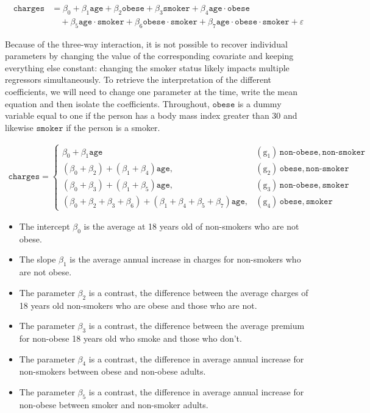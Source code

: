 \documentclass[
  11pt,
  letterpaper,
]{book}
\providecommand{\tightlist}{%
  \setlength{\itemsep}{0pt}\setlength{\parskip}{0pt}}
\theoremstyle{definition}
\theoremstyle{definition}
\theoremstyle{definition}
\theoremstyle{definition}
\theoremstyle{remark}
\begin{document}
\begin{align*}
\texttt{charges} &= \beta_{0} + \beta_{1}\texttt{age} + \beta_{2}\texttt{obese} + \beta_{3}\texttt{smoker} +
\beta_{4}\texttt{age} \cdot \texttt{obese} \\&\quad + \beta_{5}\texttt{age} \cdot \texttt{smoker} + \beta_{6}\texttt{obese} \cdot \texttt{smoker} + \beta_{7}\texttt{age} \cdot \texttt{obese} \cdot \texttt{smoker} + \varepsilon
\end{align*}

Because of the three-way interaction, it is not possible to recover individual parameters by changing the value of the corresponding covariate and keeping everything else constant: changing the smoker status likely impacts multiple regressors simultaneously. To retrieve the interpretation of the different coefficients, we will need to change one parameter at the time, write the mean equation and then isolate the coefficients. Throughout, \(\texttt{obese}\) is a dummy variable equal to one if the person has a body mass index greater than 30 and likewise \(\texttt{smoker}\) if the person is a smoker.

\begin{align*}
\texttt{charges}  =
\begin{cases}
\beta_{0} + \beta_{1}\texttt{age}  & (\mathrm{g}_1)\, \texttt{non-obese}, \texttt{non-smoker} \\
(\beta_{0} + \beta_{2}) + (\beta_{1} + \beta_{4})\texttt{age},  & (\mathrm{g}_2)\,  \texttt{obese}, \texttt{non-smoker} \\
(\beta_{0} + \beta_{3}) + (\beta_{1} + \beta_{5})\texttt{age},  & (\mathrm{g}_3)\,  \texttt{non-obese}, \texttt{smoker} \\
(\beta_{0} + \beta_{2} + \beta_{3}+ \beta_{6}) + (\beta_{1} + \beta_{4} +\beta_{5} + \beta_7)\texttt{age},  & (\mathrm{g}_4)\,  \texttt{obese}, \texttt{smoker}
\end{cases}
\end{align*}

\begin{itemize}
\tightlist
\item
  The intercept \(\beta_0\) is the average at 18 years old of non-smokers who are not obese.
\item
  The slope \(\beta_1\) is the average annual increase in charges for non-smokers who are not obese.
\item
  The parameter \(\beta_2\) is a contrast, the difference between the average charges of 18 years old non-smokers who are obese and those who are not.
\item
  The parameter \(\beta_3\) is a contrast, the difference between the average premium for non-obese 18 years old who smoke and those who don't.
\item
  The parameter \(\beta_4\) is a contrast, the difference in average annual increase for non-smokers between obese and non-obese adults.
\item
  The parameter \(\beta_5\) is a contrast, the difference in average annual increase for non-obese between smoker and non-smoker adults.
\end{itemize}
\end{document}
